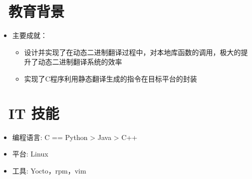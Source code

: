 \documentclass{resume}
\begin{document}
\section{\faGraduationCap\  教育背景}\normalsize
{}
\begin{itemize}
    \item {主要成就：}
    \begin{itemize}
        \item {设计并实现了在动态二进制翻译过程中，对本地库函数的调用，极大的提升了动态二进制翻译系统的效率}
        \item {实现了C程序利用静态翻译生成的指令在目标平台的封装}
    \end{itemize}
\end{itemize}



\section{\faCogs\ IT 技能}\normalsize
\begin{itemize}[parsep=0.5ex]
  \item {编程语言: C == Python > Java > C++}
  \item 平台: Linux
  \item 工具: Yocto，rpm，vim
\end{itemize}
\end{document}
